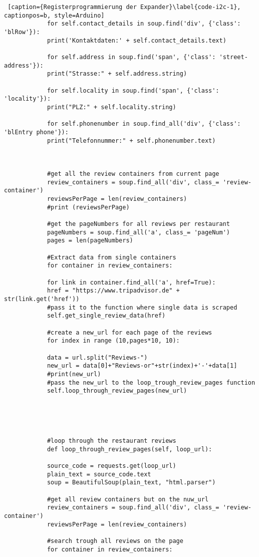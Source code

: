 \documentclass[a4paper,oneside,12pt]{report}
\begin{document}
\begin{lstlisting} [caption={Registerprogrammierung der Expander}\label{code-i2c-1}, captionpos=b, style=Arduino]
			for self.contact_details in soup.find('div', {'class': 'blRow'}):
			print('Kontaktdaten:' + self.contact_details.text)
			
			for self.address in soup.find('span', {'class': 'street-address'}):
			print("Strasse:" + self.address.string)
			
			for self.locality in soup.find('span', {'class': 'locality'}):
			print("PLZ:" + self.locality.string)
			
			for self.phonenumber in soup.find_all('div', {'class': 'blEntry phone'}):
			print("Telefonnummer:" + self.phonenumber.text)
			
			
			
			#get all the review containers from current page
			review_containers = soup.find_all('div', class_= 'review-container')
			reviewsPerPage = len(review_containers)
			#print (reviewsPerPage)
			
			#get the pageNumbers for all reviews per restaurant
			pageNumbers = soup.find_all('a', class_= 'pageNum')
			pages = len(pageNumbers)
			
			#Extract data from single containers   
			for container in review_containers:
			
			for link in container.find_all('a', href=True):
			href = "https://www.tripadvisor.de" + str(link.get('href'))
			#pass it to the function where single data is scraped
			self.get_single_review_data(href)
			
			#create a new_url for each page of the reviews
			for index in range (10,pages*10, 10):
			
			data = url.split("Reviews-")
			new_url = data[0]+"Reviews-or"+str(index)+'-'+data[1]
			#print(new_url)
			#pass the new_url to the loop_trough_review_pages function
			self.loop_through_review_pages(new_url)
			
			
			
			
			
			#loop through the restaurant reviews
			def loop_through_review_pages(self, loop_url):
			
			source_code = requests.get(loop_url)
			plain_text = source_code.text
			soup = BeautifulSoup(plain_text, "html.parser")
			
			#get all review containers but on the nuw_url
			review_containers = soup.find_all('div', class_= 'review-container')
			reviewsPerPage = len(review_containers)
			
			#search trough all reviews on the page
			for container in review_containers:
			

\end{lstlisting}
\end{document}
